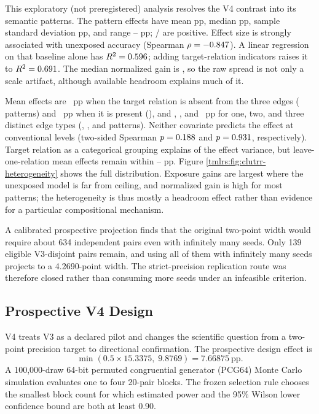 This exploratory (not preregistered) analysis resolves the V4 contrast into
its \TTwoPatterns{} semantic patterns.  The pattern effects have mean
\TTwoMean{} pp,
median \TTwoMedian{} pp, sample standard deviation \TTwoSD{} pp, and range
\TTwoMin{}--\TTwoMax{} pp; \TTwoPositive{}/\TTwoPatterns{} are positive.
Effect size is
strongly associated with unexposed accuracy
(Spearman $\rho=-0.847{}$).  A linear regression on that baseline
alone has $R^2=0.596{}$; adding target-relation indicators raises
it to $R^2=0.691{}$.  The median normalized gain is
\TTwoNGMedian{}, so the raw spread is not only a scale artifact, although
available headroom explains much of it.

Mean effects are \TTwoInAbsentMean~pp when the target relation is absent
from the three edges (\TTwoInAbsentN{} patterns) and \TTwoInPresentMean~pp
when it is present (\TTwoInPresentN), and \TTwoDistinctOneMean,
\TTwoDistinctTwoMean, and \TTwoDistinctThreeMean~pp for one, two, and three
distinct edge types (\TTwoDistinctOneN, \TTwoDistinctTwoN, and
\TTwoDistinctThreeN{} patterns).  Neither covariate predicts the effect at
conventional levels (two-sided Spearman $p=0.188{}$ and
$p=0.931{}$, respectively).
Target relation as a categorical grouping explains \TTwoEta{} of the effect
variance, but
leave-one-relation mean effects remain within
\TTwoLeaveMin{}--\TTwoLeaveMax{} pp.  Figure
\ref{tmlrs:fig:clutrr-heterogeneity} shows the full distribution.  Exposure
gains are largest where the unexposed model is far from ceiling, and
normalized gain is high for most patterns; the heterogeneity is thus mostly
a headroom effect rather than evidence for a particular compositional
mechanism.

A calibrated prospective projection finds that the original two-point width
would require about 634 independent pairs even with infinitely many seeds.
Only 139 eligible V3-disjoint pairs remain, and using all of them with
infinitely many seeds projects to a 4.2690-point width.  The strict-precision
replication route was therefore closed rather than consuming more seeds under
an infeasible criterion.

\subsection{Prospective V4 Design}

V4 treats V3 as a declared pilot and changes the scientific question from a
two-point precision target to directional confirmation.  The prospective
design effect is
\[
\min(0.5\times15.3375,\;9.8769)=7.66875\ \text{pp}.
\]
A 100,000-draw 64-bit permuted congruential generator (PCG64) Monte Carlo
simulation evaluates one to four 20-pair blocks.  The frozen selection rule
chooses the smallest block count for which estimated power and the 95\% Wilson
lower confidence bound are both at least 0.90.

